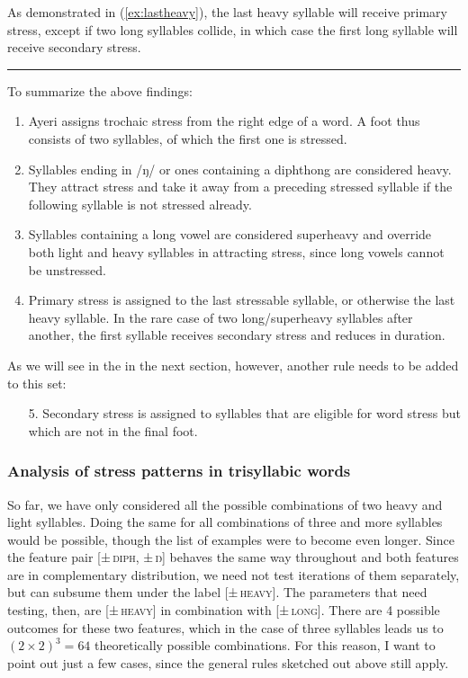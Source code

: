 As demonstrated in (\ref{ex:lastheavy}), the last heavy syllable will receive 
primary stress, except if two long syllables collide, in which case the first 
long syllable will receive secondary stress.

\plainbreak{1}

To summarize the above findings:

\begin{enumerate}\label{2sylsumm}
\item Ayeri assigns trochaic stress from the right edge of a word. A foot 
	thus consists of two syllables, of which the first one is stressed.
\item Syllables ending in /ŋ/ or ones containing a diphthong are considered 
	heavy. They attract stress and take it away from a preceding stressed 
	syllable if the following syllable is not stressed already.
\item Syllables containing a long vowel are considered superheavy and override 
	both light and heavy syllables in attracting stress, since long vowels 
	cannot be unstressed.
\item Primary stress is assigned to the last stressable syllable, or otherwise 
	the last heavy syllable. In the rare case of two long/superheavy 
	syllables after another, the first syllable receives secondary stress 
	and reduces in duration.
\end{enumerate}

\noindent As we will see in the in the next section, however, another rule
needs to be added to this set:

\begin{enumerate}
\item[5.] Secondary stress is assigned to syllables that are eligible for word 
	stress but which are not in the final foot.
\end{enumerate}

\subsubsection{Analysis of stress patterns in trisyllabic words}

So far, we have only considered all the possible combinations of two heavy and
light syllables. Doing the same for all combinations of three and more
syllables would be possible, though the list of examples were to become even
longer. Since the feature pair \textsc{[±\,diph, ±\,ŋ]} behaves the same way
throughout and both features are in complementary distribution, we need not
test iterations of them separately, but can subsume them under the label
\textsc{[±\,heavy]}. The parameters that need testing, then, are
\textsc{[±\,heavy]} in combination with \textsc{[±\,long]}. There are 4
possible outcomes for these two features, which in the case of three syllables
leads us to $(2 \times 2) ^ 3 = 64$ theoretically possible combinations. For
this reason, I want to point out just a few cases, since the general rules
sketched out above still apply.

